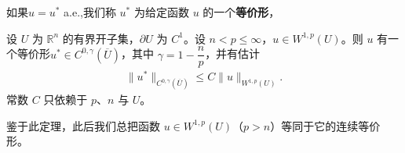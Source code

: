 \documentclass[../../main.tex]{subfiles}
\begin{document}
\begin{definition}\label{definition:ch05-版本}
如果$u=u^{*}$ a.e.,我们称 $u^{*}$ 为给定函数 $u$ 的一个\textbf{等价形}，
\end{definition}

\begin{theorem}\label{theorem:ch05-W1p有界估计}
设 $U$ 为 $\mathbb{R}^{n}$ 的有界开子集，$\partial U$ 为 $C^{1}$。设 $n<p\leqslant\infty$，$u\in W^{1,p}(U)$。则 $u$ 有一个等价形$u^{*}\in C^{0,\gamma}(\overline{U})$，其中 $\gamma=1-\dfrac{n}{p}$，并有估计
\begin{align*}
\|u^{*}\|_{C^{0,\gamma}(\overline{U})}\leqslant C\|u\|_{W^{1,p}(U)}.
\end{align*}
常数 $C$ 只依赖于 $p$、$n$ 与 $U$。
\end{theorem}
\begin{remark}
鉴于此定理，此后我们总把函数 $u\in W^{1,p}(U)$（$p>n$）等同于它的连续等价形。
\end{remark}
\end{document}

